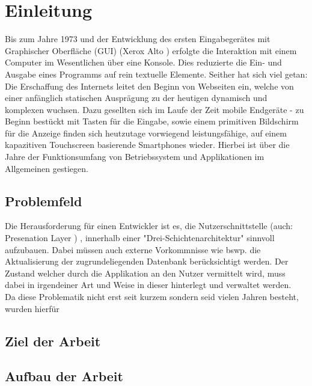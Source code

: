 \section{Einleitung}
\label{sec:einleitung}

Bis zum Jahre 1973 und der Entwicklung des ersten Eingabegerätes mit Graphischer Oberfläche (GUI) (Xerox Alto \cite{xeroxAlto}) erfolgte die Interaktion mit einem Computer im Wesentlichen über eine Konsole. Dies reduzierte die Ein- und Ausgabe eines Programms auf rein textuelle Elemente. Seither hat sich viel getan: Die Erschaffung des Internets leitet den Beginn von Webseiten ein, welche von einer anfänglich statischen Ausprägung zu der heutigen dynamisch und komplexen wuchsen. Dazu gesellten sich im Laufe der Zeit mobile Endgeräte - zu Beginn bestückt mit Tasten für die Eingabe, sowie einem primitiven Bildschirm für die Anzeige finden sich heutzutage vorwiegend leistungsfähige, auf einem kapazitiven Touchscreen basierende Smartphones wieder. Hierbei ist über die Jahre der Funktionsumfang von Betriebssystem und Applikationen im Allgemeinen gestiegen.


\subsection{Problemfeld}
\label{sec:problemfeld}
Die Herausforderung für einen Entwickler ist es, die Nutzerschnittstelle (auch: Presenation Layer \cite{presentationLayerpatternsOfEnterpriseApplicationArchitectureMartinFowler}) ,
innerhalb einer "Drei-Schichtenarchitektur"
\cite{threeTierArchitectureDonaldWolfe2013}
sinnvoll aufzubauen. Dabei müssen auch externe Vorkommnisse wie bswp. die Aktualisierung der zugrundeliegenden Datenbank berücksichtigt werden. Der Zustand welcher durch die Applikation an den Nutzer vermittelt wird, muss dabei in irgendeiner Art und Weise in dieser hinterlegt und verwaltet werden.
\\
Da diese Problematik nicht erst seit kurzem sondern seid vielen Jahren besteht, wurden hierfür 

\subsection{Ziel der Arbeit}
\label{sec:ziel-der-arbeit}

\subsection{Aufbau der Arbeit}
\label{sec:aufbau-der-arbeit}